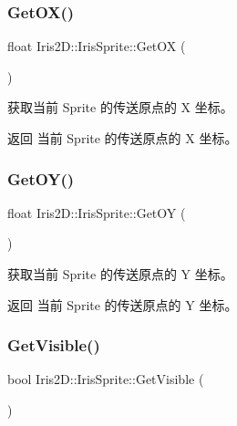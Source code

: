 \subsubsection{\texorpdfstring{Get\+O\+X()}{GetOX()}}
{\footnotesize\ttfamily float Iris2\+D\+::\+Iris\+Sprite\+::\+Get\+OX (\begin{DoxyParamCaption}{ }\end{DoxyParamCaption})}



获取当前 Sprite 的传送原点的 X 坐标。 

\begin{DoxyReturn}{返回}
当前 Sprite 的传送原点的 X 坐标。 
\end{DoxyReturn}
\mbox{\label{class_iris2_d_1_1_iris_sprite_adfdf12a18ff5237e1b27b63c2a27adaf}} 
\subsubsection{\texorpdfstring{Get\+O\+Y()}{GetOY()}}
{\footnotesize\ttfamily float Iris2\+D\+::\+Iris\+Sprite\+::\+Get\+OY (\begin{DoxyParamCaption}{ }\end{DoxyParamCaption})}



获取当前 Sprite 的传送原点的 Y 坐标。 

\begin{DoxyReturn}{返回}
当前 Sprite 的传送原点的 Y 坐标。 
\end{DoxyReturn}
\mbox{\label{class_iris2_d_1_1_iris_sprite_afb65bc13767cb566233cf4c14b4288bd}} 
\subsubsection{\texorpdfstring{Get\+Visible()}{GetVisible()}}
{\footnotesize\ttfamily bool Iris2\+D\+::\+Iris\+Sprite\+::\+Get\+Visible (\begin{DoxyParamCaption}{ }\end{DoxyParamCaption})}



